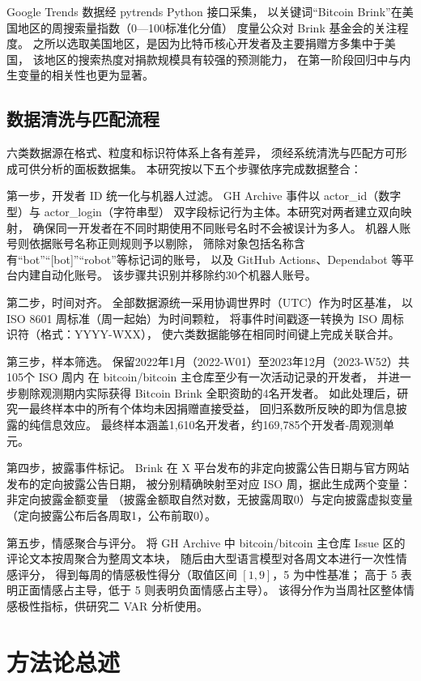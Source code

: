 Google Trends 数据经 pytrends Python 接口采集，
以关键词“Bitcoin Brink”在美国地区的周搜索量指数（0—100标准化分值）
度量公众对 Brink 基金会的关注程度。
之所以选取美国地区，是因为比特币核心开发者及主要捐赠方多集中于美国，
该地区的搜索热度对捐款规模具有较强的预测能力，
在第一阶段回归中与内生变量的相关性也更为显著。

\subsection{数据清洗与匹配流程}

六类数据源在格式、粒度和标识符体系上各有差异，
须经系统清洗与匹配方可形成可供分析的面板数据集。
本研究按以下五个步骤依序完成数据整合：

第一步，开发者 ID 统一化与机器人过滤。
GH Archive 事件以 actor\_id（数字型）与 actor\_login（字符串型）
双字段标记行为主体。本研究对两者建立双向映射，
确保同一开发者在不同时期使用不同账号名时不会被误计为多人。
机器人账号则依据账号名称正则规则予以剔除，
筛除对象包括名称含有“bot”“[bot]”“robot”等标记词的账号，
以及 GitHub Actions、Dependabot 等平台内建自动化账号。
该步骤共识别并移除约30个机器人账号。

第二步，时间对齐。
全部数据源统一采用协调世界时（UTC）作为时区基准，
以 ISO 8601 周标准（周一起始）为时间颗粒，
将事件时间戳逐一转换为 ISO 周标识符（格式：YYYY-WXX），
使六类数据能够在相同时间键上完成关联合并。

第三步，样本筛选。
保留2022年1月（2022-W01）至2023年12月（2023-W52）共105个 ISO 周内
在 bitcoin/bitcoin 主仓库至少有一次活动记录的开发者，
并进一步剔除观测期内实际获得 Bitcoin Brink 全职资助的4名开发者。
如此处理后，研究一最终样本中的所有个体均未因捐赠直接受益，
回归系数所反映的即为信息披露的纯信息效应。
最终样本涵盖1,610名开发者，约169,785个开发者-周观测单元。

第四步，披露事件标记。
Brink 在 X 平台发布的非定向披露公告日期与官方网站发布的定向披露公告日期，
被分别精确映射至对应 ISO 周，据此生成两个变量：非定向披露金额变量
（披露金额取自然对数，无披露周取0）与定向披露虚拟变量
（定向披露公布后各周取1，公布前取0）。

第五步，情感聚合与评分。
将 GH Archive 中 bitcoin/bitcoin 主仓库 Issue 区的评论文本按周聚合为整周文本块，
随后由大型语言模型对各周文本进行一次性情感评分，
得到每周的情感极性得分（取值区间 $[1, 9]$，5 为中性基准；
高于 5 表明正面情感占主导，低于 5 则表明负面情感占主导）。
该得分作为当周社区整体情感极性指标，供研究二 VAR 分析使用。

\section{方法论总述}

